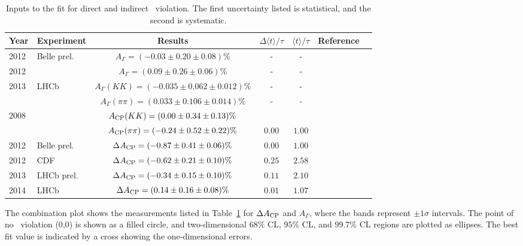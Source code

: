 \begin{table}
\centering 
\caption{Inputs to the fit for direct and indirect \cp\ violation. 
The first uncertainty listed is statistical, and the second is systematic.}
\label{tab:charm:dir_indir_comb}
\vspace{3pt}
\begin{tabular}{ll|ccccc}
\hline \hline
Year & 	Experiment	& Results
& $\Delta \langle t\rangle/\tau$ & $\langle t\rangle/\tau$ & Reference\\
\hline
2012	& Belle	prel. & $A_\Gamma = (-0.03 \pm 0.20 \pm 0.08 )\%$ &	-&	-&	 
\cite{Staric:2012ta}\\
2012	& \babar	& $A_\Gamma = (0.09 \pm 0.26 \pm 0.06 )\%$ &	-&	-&	 
\cite{Lees:2012qh}\\
2013	& LHCb	& $A_\Gamma(KK) = (-0.035 \pm 0.062 \pm 0.012 )\%$ &	-&	-&	 
\cite{Aaij:2013ria}\\
    	&     	& $A_\Gamma(\pi\pi) = (0.033 \pm 0.106 \pm 0.014 )\%$ &	-&	-&	 
                   \\
2008	& \babar	& $A_{\rm CP}(KK) = (0.00 \pm 0.34 \pm 0.13 )\%$&&&\\ 
& & $A_{\rm CP}(\pi\pi) = (-0.24 \pm 0.52 \pm 0.22 )\%$ &	$0.00$ &	
$1.00$ &	 \cite{Aubert:2007if}\\
2012	& Belle	prel. & $\Delta A_{\rm CP} = (-0.87 \pm 0.41 \pm 0.06 )\%$ &	
$0.00$ &	$1.00$ &	 \cite{Ko:2012px}\\
2012	& CDF	 & $\Delta A_{\rm CP} = (-0.62 \pm 0.21 \pm 0.10 )\%$ &	
$0.25$ &	$2.58$ &	 \cite{Collaboration:2012qw}\\
2013	& LHCb	prel. & $\Delta A_{\rm CP} = (-0.34 \pm 0.15 \pm 0.10 )\%$ &	
$0.11$ &	$2.10$ &	 \cite{LHCb:2013dka}\\
2014	& LHCb	& $\Delta A_{\rm CP} = (0.14 \pm 0.16 \pm 0.08 )\%$ &	
$0.01$ &	$1.07$ &	 \cite{Aaij:2014gsa}\\
\hline
\end{tabular}
\end{table}

The combination plot shows the measurements listed in 
Table~\ref{tab:charm:dir_indir_comb} for
$\Delta A_{\rm CP}$ and $A_\Gamma$, where the bands represent $\pm1\sigma$ 
intervals.  The point of no \cp\ violation (0,0) is shown as a filled circle, 
and two-dimensional $68\%$ CL, $95\%$ CL, and $99.7\%$ CL regions are plotted 
as ellipses. The best fit value is indicated by a cross showing the
one-dimensional errors.

